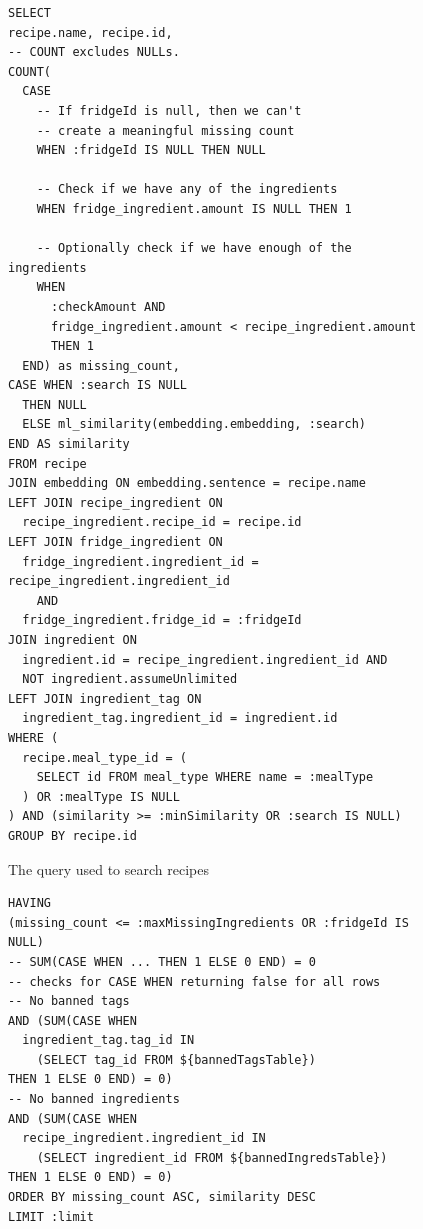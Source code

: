 \cleartoleftpage\begin{figure}
  \centering
  \caption{\label{fig:search_query}The query used to search recipes}
  \begin{verbatim}
SELECT
recipe.name, recipe.id,
-- COUNT excludes NULLs.
COUNT(
  CASE
    -- If fridgeId is null, then we can't
    -- create a meaningful missing count
    WHEN :fridgeId IS NULL THEN NULL

    -- Check if we have any of the ingredients
    WHEN fridge_ingredient.amount IS NULL THEN 1

    -- Optionally check if we have enough of the ingredients
    WHEN
      :checkAmount AND
      fridge_ingredient.amount < recipe_ingredient.amount
      THEN 1
  END) as missing_count,
CASE WHEN :search IS NULL
  THEN NULL
  ELSE ml_similarity(embedding.embedding, :search)
END AS similarity
FROM recipe
JOIN embedding ON embedding.sentence = recipe.name
LEFT JOIN recipe_ingredient ON
  recipe_ingredient.recipe_id = recipe.id
LEFT JOIN fridge_ingredient ON
  fridge_ingredient.ingredient_id = recipe_ingredient.ingredient_id
    AND
  fridge_ingredient.fridge_id = :fridgeId
JOIN ingredient ON
  ingredient.id = recipe_ingredient.ingredient_id AND
  NOT ingredient.assumeUnlimited
LEFT JOIN ingredient_tag ON
  ingredient_tag.ingredient_id = ingredient.id
WHERE (
  recipe.meal_type_id = (
    SELECT id FROM meal_type WHERE name = :mealType
  ) OR :mealType IS NULL
) AND (similarity >= :minSimilarity OR :search IS NULL)
GROUP BY recipe.id
  \end{verbatim}
\end{figure}

\begin{figure}\ContinuedFloat{}
  \begin{verbatim}
HAVING
(missing_count <= :maxMissingIngredients OR :fridgeId IS NULL)
-- SUM(CASE WHEN ... THEN 1 ELSE 0 END) = 0
-- checks for CASE WHEN returning false for all rows
-- No banned tags
AND (SUM(CASE WHEN
  ingredient_tag.tag_id IN
    (SELECT tag_id FROM ${bannedTagsTable})
THEN 1 ELSE 0 END) = 0)
-- No banned ingredients
AND (SUM(CASE WHEN
  recipe_ingredient.ingredient_id IN
    (SELECT ingredient_id FROM ${bannedIngredsTable})
THEN 1 ELSE 0 END) = 0)
ORDER BY missing_count ASC, similarity DESC
LIMIT :limit
  \end{verbatim}
\end{figure}

